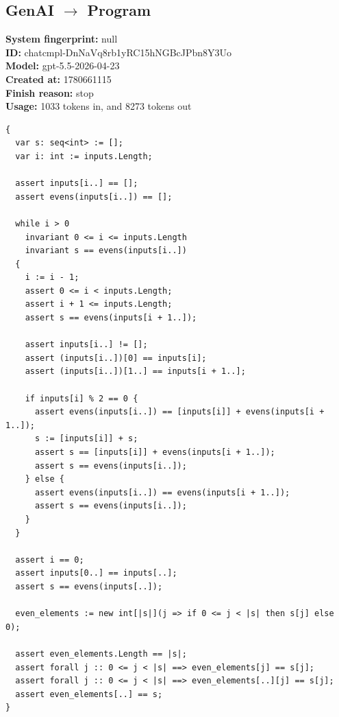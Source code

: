 \documentclass{article}
\begin{document}
\subsection*{GenAI $\rightarrow$ Program}
\textbf{System fingerprint: }null
\\\textbf{ID: }chatcmpl-DnNaVq8rb1yRC15hNGBcJPbn8Y3Uo
\\\textbf{Model: }gpt-5.5-2026-04-23
\\\textbf{Created at: }1780661115
\\\textbf{Finish reason: }stop
\\\textbf{Usage: }1033 tokens in, and 8273 tokens out
\begin{lstlisting}
{
  var s: seq<int> := [];
  var i: int := inputs.Length;

  assert inputs[i..] == [];
  assert evens(inputs[i..]) == [];

  while i > 0
    invariant 0 <= i <= inputs.Length
    invariant s == evens(inputs[i..])
  {
    i := i - 1;
    assert 0 <= i < inputs.Length;
    assert i + 1 <= inputs.Length;
    assert s == evens(inputs[i + 1..]);

    assert inputs[i..] != [];
    assert (inputs[i..])[0] == inputs[i];
    assert (inputs[i..])[1..] == inputs[i + 1..];

    if inputs[i] % 2 == 0 {
      assert evens(inputs[i..]) == [inputs[i]] + evens(inputs[i + 1..]);
      s := [inputs[i]] + s;
      assert s == [inputs[i]] + evens(inputs[i + 1..]);
      assert s == evens(inputs[i..]);
    } else {
      assert evens(inputs[i..]) == evens(inputs[i + 1..]);
      assert s == evens(inputs[i..]);
    }
  }

  assert i == 0;
  assert inputs[0..] == inputs[..];
  assert s == evens(inputs[..]);

  even_elements := new int[|s|](j => if 0 <= j < |s| then s[j] else 0);

  assert even_elements.Length == |s|;
  assert forall j :: 0 <= j < |s| ==> even_elements[j] == s[j];
  assert forall j :: 0 <= j < |s| ==> even_elements[..][j] == s[j];
  assert even_elements[..] == s;
}
\end{lstlisting}
\end{document}
